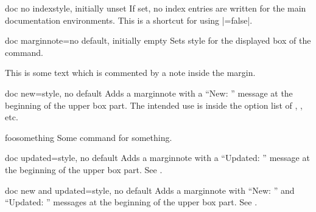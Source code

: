 \begin{docTcbKey}[][doc new={2020-04-22}]{doc no index}{}{style, initially unset}
  If set, no index entries are written for the main documentation
  environments. This is a shortcut for using |=false|.
\end{docTcbKey}



\begin{docTcbKey}[][doc new=2014-09-19]{doc marginnote}{=}{no default, initially empty}
  Sets style  for the displayed box of the  command.
\begin{dispExample}
%
This is some text
which is commented by a note inside the margin.
\end{dispExample}
\end{docTcbKey}

\begin{docTcbKey}[][doc new=2014-09-19]{doc new}{=}{style, no default}
  Adds a marginnote with a \enquote{New: } message at the beginning of
  the upper box part. The intended use is inside the option list of
  , , etc.
  \makeatletter\renewcommand*{\tcbdocnew}[1]{\kvtcb@text@new: #1}\makeatother%
\begin{dispExample}
\begin{docCommand}[doc new=2000-01-01]{foosomething}{}
Some command for something.
\end{docCommand}
\end{dispExample}
\end{docTcbKey}


\begin{docTcbKey}[][doc new=2014-09-19]{doc updated}{=}{style, no default}
  Adds a marginnote with a \enquote{Updated: } message at the beginning of
  the upper box part. See .
\end{docTcbKey}


\begin{docTcbKey}[][doc new=2014-09-19]{doc new and updated}{=}{style, no default}
  Adds a marginnote with \enquote{New: } and \enquote{Updated: } messages at the beginning of
  the upper box part. See .
\end{docTcbKey}



